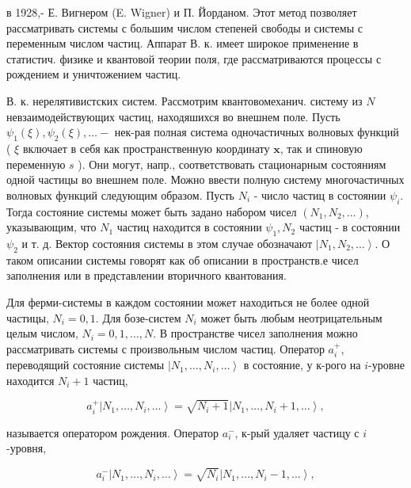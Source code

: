 \documentclass[10pt]{article}
\begin{document}
в 1928,- Е. Вигнером (E. Wigner) и П. Йорданом. Этот метод позволяет рассматривать системы с большим числом степеней свободы и системы с переменным числом частиц. Аппарат В. к. имеет широкое применение в статистич. физике и квантовой теории поля, где рассматриваются процессы с рождением и уничтожением частиц.



В. к. нерелятивистских систем. Рассмотрим квантовомеханич. систему из $N$ невзаимодействующих частиц, находяшихся во внешнем поле. Пусть $\psi_{1}(\xi), \psi_{2}(\xi), \ldots-$ нек-рая полная система одночастичных волновых функций ( $\xi$ включает в себя как пространственную координату $\boldsymbol{x}$, так и спиновую переменную $s$ ). Они могут, напр., соответствовать стационарным состояниям одной частицы во внешнем поле. Можно ввести полную систему многочастичных волновых функций следующим образом. Пусть $N_{i}$ - число частиц в состоянии $\psi_{i}$. Тогда состояние системы может быть задано набором чисел $\left(N_{1}, N_{2}, \ldots\right)$, указывающим, что $N_{1}$ частиц находится в состоянии $\psi_{1}, N_{2}$ частиц - в состоянии $\psi_{2}$ и т. д. Вектор состояния системы в этом случае обозначают $\left|N_{1}, N_{2}, \ldots\right\rangle$. О таком описании системы говорят как об описании в пространств.е чисел заполнения или в представлении вторичного квантования.



Для ферми-системы в каждом состоянии может находиться не более одной частицы, $N_{i}=0,1$. Для бозе-систем $N_{i}$ может быть любым неотрицательным целым числом, $N_{i}=0,1, \ldots, N$. В пространстве чисел заполнения можно рассматривать системы с произвольным числом частиц. Оператор $a_{i}^{+}$, переводящий состояние системы $\left|N_{1}, \ldots, N_{i}, \ldots\right\rangle$ в состояние, у к-рого на $i$-уровне находится $N_{i}+1$ частиц,



\[

a_{i}^{+}\left|N_{1}, \ldots, N_{i}, \ldots\right\rangle=\sqrt{N_{i}+1}\left|N_{1}, \ldots, N_{i}+1, \ldots\right\rangle,

\]



называется оператором рождения. Оператор $a_{i}^{-}$, к-рый удаляет частицу с $i$-уровня,



\[

a_{i}^{-}\left|N_{1}, \ldots, N_{i}, \ldots\right\rangle=\sqrt{N_{i}}\left|N_{1}, \ldots, N_{i}-1, \ldots\right\rangle,

\]
\end{document}
